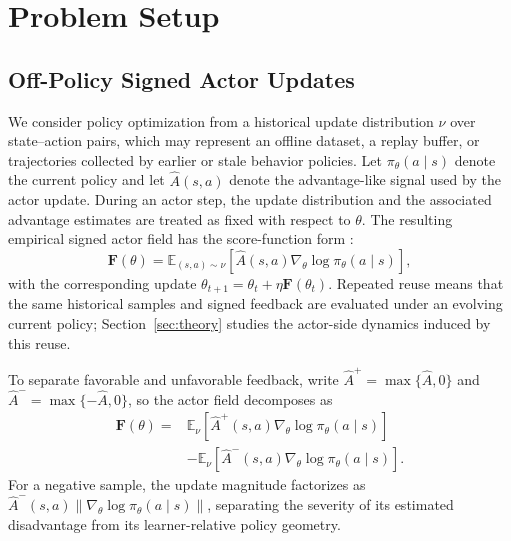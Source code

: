 \documentclass{article}
\theoremstyle{plain}
\theoremstyle{definition}
\theoremstyle{remark}
\begin{document}
\section{Problem Setup}
\label{sec:problem_setup}


\subsection{Off-Policy Signed Actor Updates}

We consider policy optimization from a historical update distribution
$\nu$ over state--action pairs, which may represent an offline dataset,
a replay buffer, or trajectories collected by earlier or stale behavior
policies. Let $\pi_\theta(a \mid s)$ denote the current policy and let
$\widehat{A}(s,a)$ denote the advantage-like signal used by the actor
update. During an actor step, the update distribution and the associated
advantage estimates are treated as fixed with respect to $\theta$. The resulting empirical signed actor field has the score-function form
\citep{williams1992simple,sutton2000policy}:
\begin{equation}
    \mathbf{F}(\theta)
    =
    \mathbb{E}_{(s,a)\sim\nu}
    \left[
        \widehat{A}(s,a)
        \nabla_\theta \log \pi_\theta(a \mid s)
    \right],
    \label{eq:empirical_actor_field}
\end{equation}
with the corresponding update
\(\theta_{t+1}=\theta_t+\eta\mathbf{F}(\theta_t)\).
Repeated reuse means that the same historical samples and signed feedback
are evaluated under an evolving current policy;
Section~\ref{sec:theory} studies the actor-side dynamics induced by this
reuse.

To separate favorable and unfavorable feedback, write
\(\widehat A^{+}=\max\{\widehat A,0\}\) and
\(\widehat A^{-}=\max\{-\widehat A,0\}\), so the actor field decomposes as
\begin{equation}
\begin{aligned}
    \mathbf{F}(\theta)
    ={}&
    \mathbb{E}_{\nu}
    \left[
        \widehat{A}^{+}(s,a)
        \nabla_\theta \log \pi_\theta(a \mid s)
    \right] \\
    &-
    \mathbb{E}_{\nu}
    \left[
        \widehat{A}^{-}(s,a)
        \nabla_\theta \log \pi_\theta(a \mid s)
    \right].
\end{aligned}
\label{eq:signed_actor_decomposition}
\end{equation}
For a negative sample, the update magnitude factorizes as
$\widehat{A}^{-}(s,a)
\lVert\nabla_\theta \log \pi_\theta(a \mid s)\rVert$,
separating the severity of its estimated disadvantage from its
learner-relative policy geometry.
\end{document}
